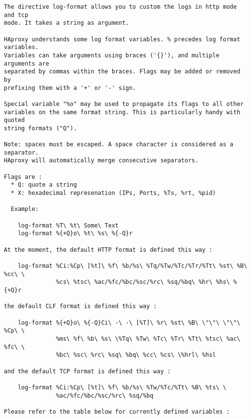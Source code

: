 \begin{verbatim}
The directive log-format allows you to custom the logs in http mode and tcp
mode. It takes a string as argument.

HAproxy understands some log format variables. % precedes log format variables.
Variables can take arguments using braces ('{}'), and multiple arguments are
separated by commas within the braces. Flags may be added or removed by
prefixing them with a '+' or '-' sign.

Special variable "%o" may be used to propagate its flags to all other
variables on the same format string. This is particularly handy with quoted
string formats ("Q").

Note: spaces must be escaped. A space character is considered as a separator.
HAproxy will automatically merge consecutive separators.

Flags are :
  * Q: quote a string
  * X: hexadecimal represenation (IPs, Ports, %Ts, %rt, %pid)

  Example:

    log-format %T\ %t\ Some\ Text
    log-format %{+Q}o\ %t\ %s\ %{-Q}r

At the moment, the default HTTP format is defined this way :

    log-format %Ci:%Cp\ [%t]\ %f\ %b/%s\ %Tq/%Tw/%Tc/%Tr/%Tt\ %st\ %B\ %cc\ \
               %cs\ %tsc\ %ac/%fc/%bc/%sc/%rc\ %sq/%bq\ %hr\ %hs\ %{+Q}r

the default CLF format is defined this way :

    log-format %{+Q}o\ %{-Q}Ci\ -\ -\ [%T]\ %r\ %st\ %B\ \"\"\ \"\"\ %Cp\ \
               %ms\ %f\ %b\ %s\ \%Tq\ %Tw\ %Tc\ %Tr\ %Tt\ %tsc\ %ac\ %fc\ \
               %bc\ %sc\ %rc\ %sq\ %bq\ %cc\ %cs\ \%hrl\ %hsl

and the default TCP format is defined this way :

    log-format %Ci:%Cp\ [%t]\ %f\ %b/%s\ %Tw/%Tc/%Tt\ %B\ %ts\ \
               %ac/%fc/%bc/%sc/%rc\ %sq/%bq

Please refer to the table below for currently defined variables :


\end{verbatim}
